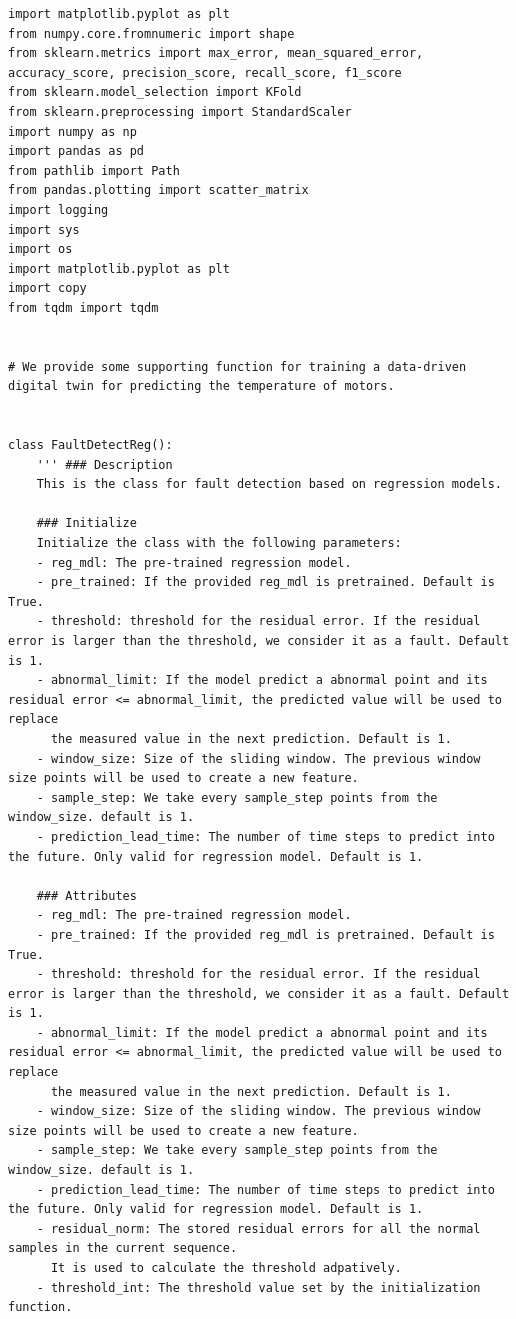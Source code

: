 \documentclass[11pt,a4paper]{article}
\begin{document}
\begin{lstlisting}[style=pyfull]
import matplotlib.pyplot as plt
from numpy.core.fromnumeric import shape
from sklearn.metrics import max_error, mean_squared_error, accuracy_score, precision_score, recall_score, f1_score
from sklearn.model_selection import KFold
from sklearn.preprocessing import StandardScaler
import numpy as np
import pandas as pd
from pathlib import Path
from pandas.plotting import scatter_matrix
import logging
import sys
import os
import matplotlib.pyplot as plt
import copy
from tqdm import tqdm


# We provide some supporting function for training a data-driven digital twin for predicting the temperature of motors.


class FaultDetectReg():
    ''' ### Description
    This is the class for fault detection based on regression models.

    ### Initialize
    Initialize the class with the following parameters:
    - reg_mdl: The pre-trained regression model.
    - pre_trained: If the provided reg_mdl is pretrained. Default is True.
    - threshold: threshold for the residual error. If the residual error is larger than the threshold, we consider it as a fault. Default is 1.
    - abnormal_limit: If the model predict a abnormal point and its residual error <= abnormal_limit, the predicted value will be used to replace
      the measured value in the next prediction. Default is 1.
    - window_size: Size of the sliding window. The previous window size points will be used to create a new feature.
    - sample_step: We take every sample_step points from the window_size. default is 1.
    - prediction_lead_time: The number of time steps to predict into the future. Only valid for regression model. Default is 1.

    ### Attributes
    - reg_mdl: The pre-trained regression model.
    - pre_trained: If the provided reg_mdl is pretrained. Default is True.
    - threshold: threshold for the residual error. If the residual error is larger than the threshold, we consider it as a fault. Default is 1.
    - abnormal_limit: If the model predict a abnormal point and its residual error <= abnormal_limit, the predicted value will be used to replace
      the measured value in the next prediction. Default is 1.
    - window_size: Size of the sliding window. The previous window size points will be used to create a new feature.
    - sample_step: We take every sample_step points from the window_size. default is 1.
    - prediction_lead_time: The number of time steps to predict into the future. Only valid for regression model. Default is 1.
    - residual_norm: The stored residual errors for all the normal samples in the current sequence.
      It is used to calculate the threshold adpatively.
    - threshold_int: The threshold value set by the initialization function.


\end{lstlisting}
\end{document}
